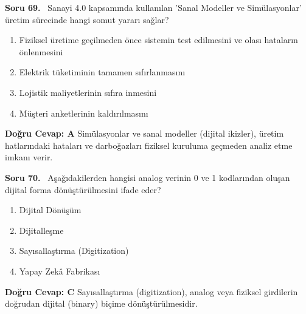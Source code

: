 \documentclass[11pt,a4paper,openany]{book}
\begin{document}
\needspace{5cm}
\vspace{8pt}
\noindent\textbf{\large\sffamily Soru 69.} \ Sanayi 4.0 kapsamında kullanılan 'Sanal Modeller ve Simülasyonlar' üretim sürecinde hangi somut yararı sağlar?
\begin{enumerate}[label=\Alph*), leftmargin=25pt, topsep=4pt, itemsep=2pt]
    \item Fiziksel üretime geçilmeden önce sistemin test edilmesini ve olası hataların önlenmesini
    \item Elektrik tüketiminin tamamen sıfırlanmasını
    \item Lojistik maliyetlerinin sıfıra inmesini
    \item Müşteri anketlerinin kaldırılmasını
\end{enumerate}
\vspace{4pt}
\begin{tcolorbox}[title=Cevap ve Açıklama, colback=gray!3!white, colframe=primarycolor!90!black, arc=2mm, fonttitle=\bfseries\sffamily, top=6pt, bottom=6pt]
    \textbf{Doğru Cevap: A}
    \vspace{2pt}
    Simülasyonlar ve sanal modeller (dijital ikizler), üretim hatlarındaki hataları ve darboğazları fiziksel kuruluma geçmeden analiz etme imkanı verir.
\end{tcolorbox}
\vspace{10pt}

\needspace{5cm}
\vspace{8pt}
\noindent\textbf{\large\sffamily Soru 70.} \ Aşağıdakilerden hangisi analog verinin 0 ve 1 kodlarından oluşan dijital forma dönüştürülmesini ifade eder?
\begin{enumerate}[label=\Alph*), leftmargin=25pt, topsep=4pt, itemsep=2pt]
    \item Dijital Dönüşüm
    \item Dijitalleşme
    \item Sayısallaştırma (Digitization)
    \item Yapay Zekâ Fabrikası
\end{enumerate}
\vspace{4pt}
\begin{tcolorbox}[title=Cevap ve Açıklama, colback=gray!3!white, colframe=primarycolor!90!black, arc=2mm, fonttitle=\bfseries\sffamily, top=6pt, bottom=6pt]
    \textbf{Doğru Cevap: C}
    \vspace{2pt}
    Sayısallaştırma (digitization), analog veya fiziksel girdilerin doğrudan dijital (binary) biçime dönüştürülmesidir.
\end{tcolorbox}
\vspace{10pt}
\end{document}
